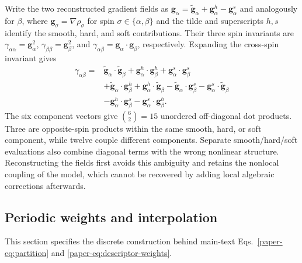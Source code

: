 \documentclass[10pt,a4paper]{article}
\begin{document}
Write the two reconstructed gradient fields as $\mathbf g_\alpha=\widetilde{\mathbf g}_\alpha+\mathbf g^h_\alpha-\mathbf g^s_\alpha$ and analogously for $\beta$, where $\mathbf g_\sigma=\nabla\rho_\sigma$ for spin $\sigma\in\{\alpha,\beta\}$ and the tilde and superscripts $h,s$ identify the smooth, hard, and soft contributions. Their three spin invariants are $\gamma_{\alpha\alpha}=\mathbf g_\alpha^2$, $\gamma_{\beta\beta}=\mathbf g_\beta^2$, and $\gamma_{\alpha\beta}=\mathbf g_\alpha\cdot\mathbf g_\beta$, respectively. Expanding the cross-spin invariant gives
\begin{align}
\gamma_{\alpha\beta}={}&\widetilde{\mathbf g}_\alpha\cdot\widetilde{\mathbf g}_\beta
+\mathbf g^h_\alpha\cdot\mathbf g^h_\beta+\mathbf g^s_\alpha\cdot\mathbf g^s_\beta\nonumber\\
&+\widetilde{\mathbf g}_\alpha\cdot\mathbf g^h_\beta+\mathbf g^h_\alpha\cdot\widetilde{\mathbf g}_\beta
-\widetilde{\mathbf g}_\alpha\cdot\mathbf g^s_\beta-\mathbf g^s_\alpha\cdot\widetilde{\mathbf g}_\beta\nonumber\\
&-\mathbf g^h_\alpha\cdot\mathbf g^s_\beta-\mathbf g^s_\alpha\cdot\mathbf g^h_\beta.
\end{align}
The six component vectors give $\binom{6}{2}=15$ unordered off-diagonal dot products. Three are opposite-spin products within the same smooth, hard, or soft component, while twelve couple different components.  Separate smooth/hard/soft evaluations also combine diagonal terms with the wrong nonlinear structure. Reconstructing the fields first avoids this ambiguity and retains the nonlocal coupling of the model, which cannot be recovered by adding local algebraic corrections afterwards.

\subsection{Periodic weights and interpolation}
\label{sec:periodic-weights}

This section specifies the discrete construction behind main-text Eqs.~\eqref{paper-eq:partition} and \eqref{paper-eq:descriptor-weights}.
\end{document}

